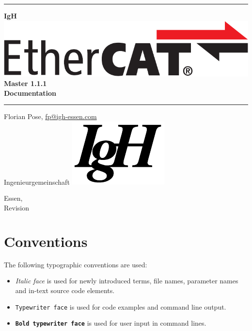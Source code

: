 \documentclass[a4paper,12pt,BCOR6mm,bibtotoc,idxtotoc]{scrbook}
\makeatletter
\renewcommand*{\lstlistoflistings}{%
  \begingroup
    \if@twocolumn
      \@restonecoltrue\onecolumn
    \else
      \@restonecolfalse
    \fi
    \lol@heading
    \setlength{\parskip}{\z@}%
    \setlength{\parindent}{\z@}%
    \setlength{\parfillskip}{\z@ \@plus 1fil}%
    \@starttoc{lol}%
    \if@restonecol\twocolumn\fi
  \endgroup
}
\newcommand{\IgH}{\raisebox{-0.7667ex}
  {\includegraphics[height=2.2ex]{images/ighsign}}}
\newcommand{\masterversion}{1.1.1}
\makeatother
\begin{document}
\pagestyle{empty}

\begin{titlepage}
  \begin{center}
    \rule{\textwidth}{1.5mm}

    {\Huge\bf IgH \includegraphics[height=2.4ex]{images/ethercat}
      Master \masterversion\\[1ex]
      Documentation}

    \vspace{1ex}
    \rule{\textwidth}{1.5mm}

    \vspace{\fill}
    {\Large Florian Pose, \url{fp@igh-essen.com}\\[1ex]
      Ingenieurgemeinschaft \IgH}

    \vspace{\fill}
    {\Large Essen, \SVNDate\\[1ex]
      Revision \SVNRevision}
  \end{center}
\end{titlepage}


\tableofcontents
\listoftables
\listoffigures
\lstlistoflistings


\newpage
\pagestyle{scrheadings}

\section*{Conventions}

The following typographic conventions are used:

\begin{itemize}
\item \textit{Italic face} is used for newly introduced terms, file
  names, parameter names and in-text source code elements.
\item \texttt{Typewriter face} is used for code examples and
  command line output.
\item \texttt{\textbf{Bold typewriter face}} is used for user input in
  command lines.
\end{itemize}
\end{document}
